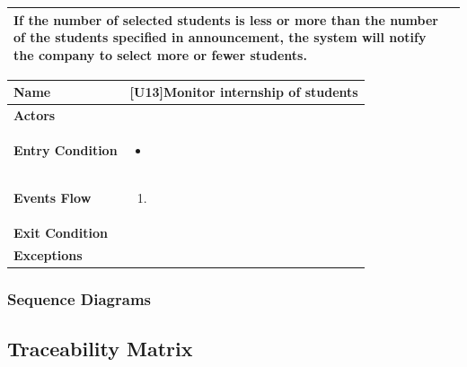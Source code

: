 \begin{center}
\begin{tabular}{|p{9em}|p{27em}|}
         If the number of selected students is less or more than the number of the students specified in announcement, the system will notify the company to 
         select more or fewer students.\\
        \hline
    \end{tabular}
\end{center}

\begin{center}
    \begin{tabular}{|p{9em}|p{27em}|}
        \hline
        \rowcolor{bluepoli!40} %
        \textbf{Name} & \textbf{[U13]Monitor internship of students} \\
        \hline
        \textbf{Actors} & \\
        \hline
        \textbf{Entry Condition} & 
        \begin{itemize}
            \item 
        \end{itemize} \\
        \hline
        \textbf{Events Flow} & 
        \begin{enumerate}
            \item 
        \end{enumerate} \\
        \hline
        \textbf{Exit Condition} & 
        \\
        \hline
        \textbf{Exceptions} &
        \\
        \hline
    \end{tabular}
\end{center}


\subsubsection{Sequence Diagrams}

\subsection{Traceability Matrix}


